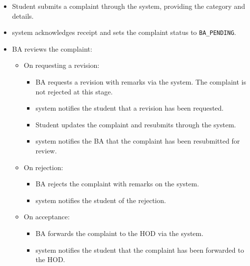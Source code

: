 \begin{itemize}
    \item Student submits a complaint through the system, providing the category and details.
    \item system acknowledges receipt and sets the complaint status to \texttt{BA\_PENDING}.

    \item BA reviews the complaint:
    \begin{itemize}
        \item On requesting a revision:
        \begin{itemize}
            \item BA requests a revision with remarks via the system. The complaint is not rejected at this stage.
            \item system notifies the student that a revision has been requested.
            \item Student updates the complaint and resubmits through the system.
            \item system notifies the BA that the complaint has been resubmitted for review.
        \end{itemize}
        \item On rejection:
        \begin{itemize}
            \item BA rejects the complaint with remarks on the system.
            \item system notifies the student of the rejection.
        \end{itemize}
        \item On acceptance:
        \begin{itemize}
            \item BA forwards the complaint to the HOD via the system.
            \item system notifies the student that the complaint has been forwarded to the HOD.
        \end{itemize}
    \end{itemize}


\end{itemize}
